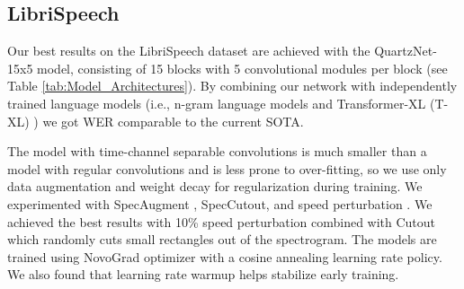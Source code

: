 \documentclass{article}
\begin{document}
\subsection{LibriSpeech}
Our best results on the LibriSpeech dataset are achieved with the QuartzNet-15x5 model, consisting of 15 blocks with 5 convolutional modules per block (see Table \ref{tab:Model_Architectures}). By combining our network with independently trained language models (i.e., n-gram language models and Transformer-XL (T-XL) \cite{transformerxl}) we got WER comparable to the current SOTA.

The model with time-channel separable convolutions is much smaller than a model with regular convolutions and is less prone to over-fitting, so we use only data augmentation and weight decay for regularization during training. We experimented with  SpecAugment \cite{park2019},  SpecCutout, and speed perturbation \cite{Ko2015}. We achieved the best results with 10\% speed perturbation combined with Cutout \cite{cutout2017} which randomly cuts small rectangles out of the spectrogram.
The models are trained using NovoGrad optimizer \cite{novograd2019} with a cosine annealing learning rate policy. We also found that learning rate warmup  helps stabilize early training. 
\end{document}
